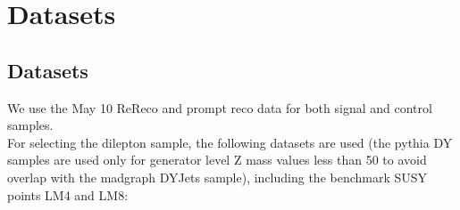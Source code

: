 
\section{Datasets}
\label{sec:datasets}

\subsection{Datasets}

We use the May 10 ReReco and prompt reco data for both signal and control samples.%
\\
For selecting the dilepton sample, the following datasets are used (the pythia DY samples are used only for generator level Z mass values less than 50 to avoid overlap with the madgraph DYJets sample), including the benchmark SUSY points LM4 and LM8:


